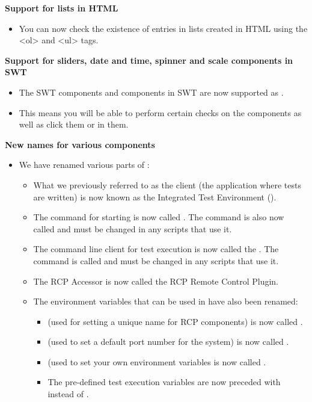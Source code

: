 \textbf{Support for lists in HTML}
\begin{itemize}
\item You can now check the existence of entries in lists created in HTML using the <ol> and <ul> tags.
\end{itemize}

\textbf{Support for sliders, date and time, spinner and scale components in SWT}
\begin{itemize}
\item The SWT components  and  components in SWT are now supported as .
\item This means you will be able to perform certain checks on the components as well as click them or in them.
\end{itemize}

\textbf{New names for various \app{} components}
\begin{itemize}
\item We have renamed various parts of \app{}:
\begin{itemize}
\item What we previously referred to as the client (the application where tests are written) is now known as the Integrated Test Environment (\ite{}).
\item The  command for starting \gdauts{} is now called . The command is also now called  and must be changed in any scripts that use it.
\item The command line client for test execution is now called the . The command is called  and must be changed in any scripts that use it. 
\item The RCP Accessor is now called the RCP Remote Control Plugin. 
\item The environment variables that can be used in \app{} have also been renamed:
\begin{itemize}
\item {} (used for setting a unique name for RCP components) is now called .
\item {} (used to set a default port number for the system) is now called .
\item {} (used to set your own environment variables is now called .
\item The pre-defined test execution variables are now preceded with  instead of . 
\end{itemize}
\end{itemize}
\end{itemize}

